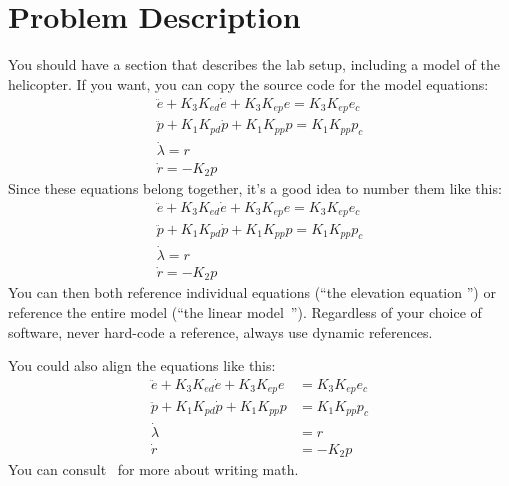 \section{Problem Description}\label{sec:prob_descr}
You should have a section that describes the lab setup, including a model of the helicopter. If you want, you can copy the source code for the model equations:
\begin{gather}
	\ddot{e} + K_{3} K_{ed} \dot{e} + K_{3} K_{ep} e = K_{3} K_{ep} e_{c} \label{eq:model_elev} \\
	\ddot{p} + K_{1} K_{pd} \dot{p} + K_{1} K_{pp} p = K_{1} K_{pp} p_{c} \label{eq:model_pitch} \\
	\dot{\lambda} = r \label{eq:model_lambda} \\
	\dot{r} = -K_{2} p \label{eq:model_r} 
\end{gather}
Since these equations belong together, it's a good idea to number them like this:
\begin{subequations}\label{eq:model}
	\begin{gather}
		\ddot{e} + K_{3} K_{ed} \dot{e} + K_{3} K_{ep} e = K_{3} K_{ep} e_{c} \label{eq:model_se_elev} \\
		\ddot{p} + K_{1} K_{pd} \dot{p} + K_{1} K_{pp} p = K_{1} K_{pp} p_{c} \label{eq:model_se_pitch} \\
		\dot{\lambda} = r \label{eq:model_se_lambda} \\
		\dot{r} = -K_{2} p \label{eq:model_se_r} 
	\end{gather}
\end{subequations}
You can then both reference individual equations (``the elevation equation '') or reference the entire model (``the linear model~''). Regardless of your choice of software, never hard-code a reference, always use dynamic references. 

You could also align the equations like this:
\begin{subequations}\label{eq:model_al}
	\begin{align}
		\ddot{e} + K_{3} K_{ed} \dot{e} + K_{3} K_{ep} e &= K_{3} K_{ep} e_{c} \label{eq:model_se_al_elev} \\
		\ddot{p} + K_{1} K_{pd} \dot{p} + K_{1} K_{pp} p &= K_{1} K_{pp} p_{c} \label{eq:model_se_al_pitch} \\
		\dot{\lambda} &= r \label{eq:model_se_al_lambda} \\
		\dot{r} &= -K_{2} p \label{eq:model_se_al_r} 
	\end{align}
\end{subequations}
You can consult~\cite{Downes2002} for more about writing math.



